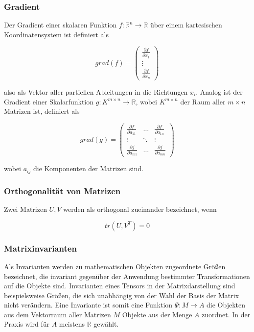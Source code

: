\documentclass[a4paper,fontsize=12pt,toc=bib,halfparskip]{scrartcl}
\begin{document}
\subsubsection{Gradient}
Der Gradient einer skalaren Funktion $f: \mathbb{R}^n \rightarrow \mathbb{R}$  \"uber einem kartesischen Koordinatensystem ist definiert als

\begin{equation}
	grad(f) = 	
	\begin{pmatrix}
		\frac{\partial f}{\partial x_1} \\
		\vdots \\
		\frac{\partial f}{\partial x_n}
	\end{pmatrix}
\end{equation}

also als Vektor aller partiellen Ableitungen in die Richtungen $x_i$. Analog ist der Gradient einer Skalarfunktion $g: K^{m\times n} \rightarrow \mathbb{R}$, wobei $K^{m\times n}$ der Raum aller $m\times n$ Matrizen ist, definiert als

\begin{equation}
	grad(g) =
	\begin{pmatrix}
		\frac{\partial f}{\partial a_{11}} & \dots & \frac{\partial f}{\partial a_{1n}}  \\
		\vdots & \ddots & \vdots \\
		\frac{\partial f}{\partial a_{m1}} & \dots & \frac{\partial f}{\partial a_{mn}} 
	\end{pmatrix}
\end{equation}

wobei $a_{ij}$ die Komponenten der Matrizen sind.

\subsubsection{Orthogonalit\"at von Matrizen}
Zwei Matrizen $U,V$ werden als orthogonal zueinander bezeichnet, wenn \cite{ennis2006orthogonal}

\begin{equation}
tr(U,V^{T}) = 0
\end{equation}

\subsubsection{Matrixinvarianten}
\label{Matrixinvarianten}
Als Invarianten werden zu mathematischen Objekten zugeordnete Gr\"o{\ss}en bezeichnet, die invariant gegen\"uber der Anwendung bestimmter Transformationen auf die Objekte sind. Invarianten eines Tensors in der Matrixdarstellung sind beispielsweise Gr\"o{\ss}en, die sich unabh\"angig von der Wahl der Basis der Matrix nicht ver\"andern\cite{ennis2006orthogonal}. Eine Invariante ist somit eine Funktion $\Psi: M \rightarrow A$ die Objekten aus dem Vektorraum aller Matrizen $M$ Objekte aus der Menge $A$ zuordnet. In der Praxis wird f\"ur $A$ meistens $\mathbb{R}$ gew\"ahlt.
\end{document}
